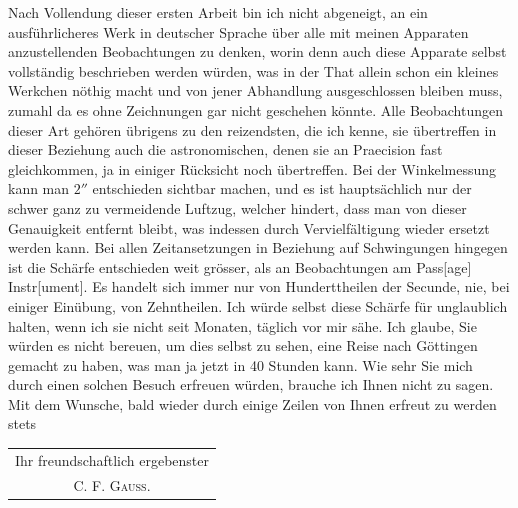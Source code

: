 Nach Vollendung dieser ersten Arbeit bin ich nicht abgeneigt, an ein
ausführlicheres Werk in deutscher Sprache über alle mit meinen Apparaten
anzustellenden Beobachtungen zu denken, worin denn auch diese Apparate
selbst vollständig beschrieben werden würden, was in der That allein schon
ein kleines Werkchen nöthig macht und von jener Abhandlung ausgeschlossen
bleiben muss, zumahl da es ohne Zeichnungen gar nicht geschehen könnte.
Alle Beobachtungen dieser Art gehören übrigens zu den reizendsten, die ich
kenne, sie übertreffen in dieser Beziehung auch die astronomischen, denen sie
an Praecision fast gleichkommen, ja in einiger Rücksicht noch übertreffen. Bei
der Winkelmessung kann man \(2''\) entschieden sichtbar machen, und es ist
\clearpage{}
\noindent hauptsächlich nur der schwer ganz zu vermeidende Luftzug, welcher hindert,
dass man von dieser Genauigkeit entfernt bleibt, was indessen durch Vervielfältigung
wieder ersetzt werden kann. Bei allen Zeitansetzungen in Beziehung
auf Schwingungen hingegen ist die Schärfe entschieden weit grösser, als an
Beobachtungen am Pass[age] Instr[ument]. Es handelt sich immer nur von
Hunderttheilen der Secunde, nie, bei einiger Einübung, von Zehntheilen. Ich
würde selbst diese Schärfe für unglaublich halten, wenn ich sie nicht seit Monaten,
täglich vor mir sähe. Ich glaube, Sie würden es nicht bereuen, um
dies selbst zu sehen, eine Reise nach Göttingen gemacht zu haben, was man
ja jetzt in 40 Stunden kann. Wie sehr Sie mich durch einen solchen Besuch
erfreuen würden, brauche ich Ihnen nicht zu sagen. Mit dem Wunsche, bald
wieder durch einige Zeilen von Ihnen erfreut zu werden stets
\begin{flushright}
\begin{tabular}{c}
Ihr freundschaftlich ergebenster\\[.8ex]
C. F. \textsc{Gauss}.
\end{tabular}
\end{flushright}
\clearpage\endgroup
